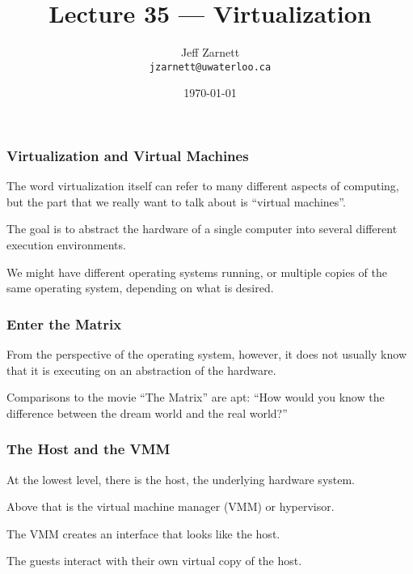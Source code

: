 

\title{Lecture 35 --- Virtualization }

\author{Jeff Zarnett \\ \small \texttt{jzarnett@uwaterloo.ca}}
\date{\today}




\begin{frame}
  \titlepage

 \end{frame}



\begin{frame}
\frametitle{Virtualization and Virtual Machines}

The word virtualization itself can refer to many different aspects of computing, but the part that we really want to talk about is ``virtual machines''. 

The goal is to abstract the hardware of a single computer into several different execution environments. 

We might have different operating systems running, or multiple copies of the same operating system, depending on what is desired. 

\end{frame}

\begin{frame}
\frametitle{Enter the Matrix}

From the perspective of the operating system, however, it does not usually know that it is executing on an abstraction of the hardware. 

Comparisons to the movie ``The Matrix'' are apt: ``How would you know the difference between the dream world and the real world?''



\end{frame}

\begin{frame}
\frametitle{The Host and the VMM}


At the lowest level, there is the \alert{host}, the underlying hardware system. 

Above that is the \alert{virtual machine manager} (VMM) or \alert{hypervisor}.

The VMM creates an interface that looks like the host. 

The \alert{guests} interact with their own virtual copy of the host.

\end{frame}


